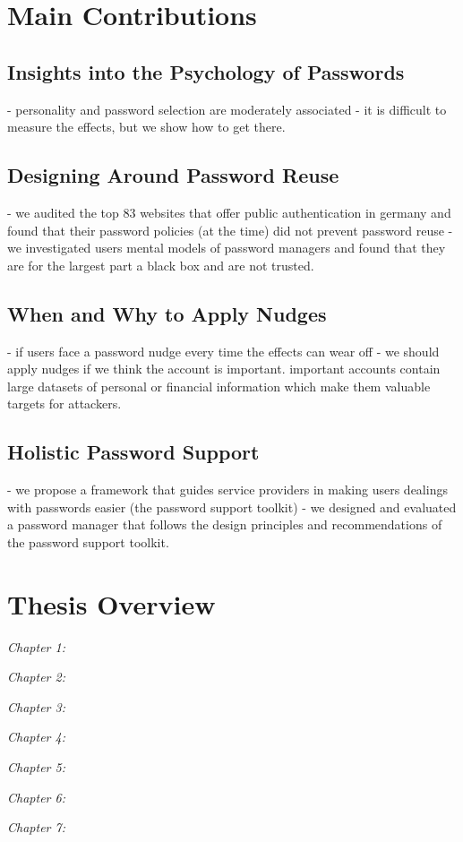 \section{Main Contributions}
\subsection{Insights into the Psychology of Passwords}
- personality and password selection are moderately associated
- it is difficult to measure the effects, but we show how to get there.

\subsection{Designing Around Password Reuse}
- we audited the top 83 websites that offer public authentication in germany and found that their password policies (at the time) did not prevent password reuse
- we investigated users mental models of password managers and found that they are for the largest part a black box and are not trusted.

\subsection{When and Why to Apply Nudges}
- if users face a password nudge every time the effects can wear off 
- we should apply nudges if we think the account is important. important accounts contain large datasets of personal or financial information which make them valuable targets for attackers.

\subsection{Holistic Password Support}
- we propose a framework that guides service providers in making users dealings with passwords easier (the password support toolkit)
- we designed and evaluated a password manager that follows the design principles and recommendations of the password support toolkit. 

\section{Thesis Overview}
\textit{Chapter 1:}

\textit{Chapter 2:}

\textit{Chapter 3:}

\textit{Chapter 4:}

\textit{Chapter 5:}

\textit{Chapter 6:}

\textit{Chapter 7:}




